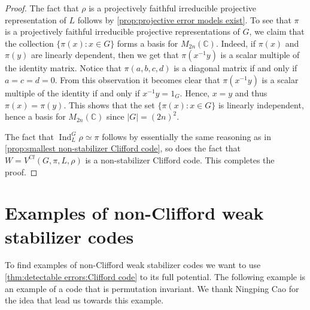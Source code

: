 \documentclass[11pt, oneside, reqno]{amsart}
\newcommand{\bbC}{\mathbb{C}}
\newcommand{\Ind}{\operatorname{Ind}}
\theoremstyle{definition}
\theoremstyle{plain}
\theoremstyle{remark}
\begin{document}
\begin{proof}
    The fact that $\rho$ is a projectively faithful irreducible projective representation of $L$ follows by \cref{prop:projective error models exist}. To see that $\pi$ is a projectively faithful irreducible projective representations of $G$, we claim that the collection $\{ \pi(x) : x \in G \}$ forms a basis for $M_{2n}(\bbC)$. Indeed, if $\pi(x)$ and $\pi(y)$ are linearly dependent, then we get that $\pi(x^{-1}y)$ is a scalar multiple of the identity matrix. Notice that $\pi(a,b,c,d)$ is a diagonal matrix if and only if $a = c = d = 0$. From this observation it becomes clear that $\pi(x^{-1}y)$ is a scalar multiple of the identity if and only if $x^{-1}y = 1_G$. Hence, $x = y$ and thus $\pi(x) = \pi(y)$. This shows that the set $\{ \pi(x) : x \in G \}$ is linearly independent, hence a basis for $M_{2n}(\bbC)$ since $|G| = (2n)^2$.
    
    The fact that $\Ind_L^G\rho \simeq \pi$ follows by essentially the same reasoning as in \cref{prop:smallest non-stabilizer Clifford code}, so does the fact that $W = V^{Cl}(G,\pi,L,\rho)$ is a non-stabilizer Clifford code. This completes the proof.
\end{proof}

\section{Examples of non-Clifford weak stabilizer codes}\label{sec:non-Clifford weak stabilizer codes}

To find examples of non-Clifford weak stabilizer codes we want to use \cref{thm:detectable errors:Clifford code} to its full potential. The following example is an example of a code that is permutation invariant. We thank Ningping Cao for the idea that lead us towards this example.
\end{document}
